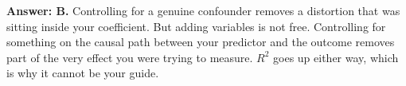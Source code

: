 \documentclass[11pt]{article}
\begin{document}
\begin{enumerate}[itemsep=14pt]
\vspace{2pt}
\textbf{Answer: B.} Controlling for a genuine confounder removes a distortion that was sitting inside your coefficient. But adding variables is not free. Controlling for something on the causal path between your predictor and the outcome removes part of the very effect you were trying to measure. $R^2$ goes up either way, which is why it cannot be your guide.
\vspace{4pt}

\end{enumerate}
\end{document}
